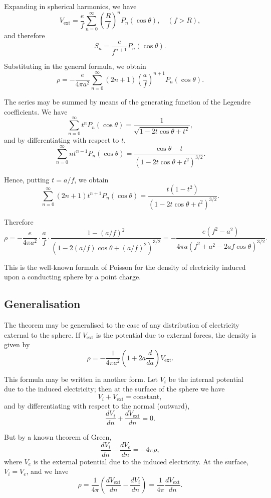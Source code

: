 \documentclass[11pt,a4paper]{book}
\begin{document}
\setcounter{page}{97}

Expanding in spherical harmonics, we have
\[
V_{\text{ext}} = \frac{e}{f} \sum_{n=0}^{\infty} \left(\frac{R}{f}\right)^n P_n(\cos\theta),
\quad (f > R),
\]
and therefore
\[
S_n = \frac{e}{f^{n+1}} P_n(\cos\theta).
\]

Substituting in the general formula, we obtain
\[
\rho = -\frac{e}{4\pi a^2} \sum_{n=0}^{\infty} (2n+1) \left(\frac{a}{f}\right)^{n+1} P_n(\cos\theta).
\]

The series may be summed by means of the generating function of the Legendre coefficients. We have
\[
\sum_{n=0}^{\infty} t^n P_n(\cos\theta) = \frac{1}{\sqrt{1-2t\cos\theta+t^2}},
\]
and by differentiating with respect to $t$,
\[
\sum_{n=0}^{\infty} n t^{n-1} P_n(\cos\theta) = \frac{\cos\theta-t}{(1-2t\cos\theta+t^2)^{3/2}}.
\]

\setcounter{page}{98}

Hence, putting $t = a/f$, we obtain
\[
\sum_{n=0}^{\infty} (2n+1) t^{n+1} P_n(\cos\theta)
= \frac{t(1-t^2)}{(1-2t\cos\theta+t^2)^{3/2}}.
\]

Therefore
\[
\rho = -\frac{e}{4\pi a^2} \cdot \frac{a}{f} \cdot \frac{1-(a/f)^2}{(1-2(a/f)\cos\theta+(a/f)^2)^{3/2}}
= -\frac{e(f^2-a^2)}{4\pi a(f^2+a^2-2af\cos\theta)^{3/2}}.
\]

This is the well-known formula of Poisson for the density of electricity induced upon a conducting sphere by a point charge.

\subsection*{Generalisation}

The theorem may be generalised to the case of any distribution of electricity external to the sphere. If $V_{\text{ext}}$ is the potential due to external forces, the density is given by
\[
\rho = -\frac{1}{4\pi a^2} \left(1 + 2a\frac{d}{da}\right) V_{\text{ext}}.
\]

\setcounter{page}{99}

This formula may be written in another form. Let $V_i$ be the internal potential due to the induced electricity; then at the surface of the sphere we have
\[
V_i + V_{\text{ext}} = \text{constant},
\]
and by differentiating with respect to the normal (outward),
\[
\frac{dV_i}{dn} + \frac{dV_{\text{ext}}}{dn} = 0.
\]

But by a known theorem of Green,
\[
\frac{dV_i}{dn} - \frac{dV_e}{dn} = -4\pi\rho,
\]
where $V_e$ is the external potential due to the induced electricity. At the surface, $V_i = V_e$, and we have
\[
\rho = \frac{1}{4\pi} \left(\frac{dV_{\text{ext}}}{dn} - \frac{dV_i}{dn}\right)
= \frac{1}{4\pi} \frac{dV_{\text{ext}}}{dn}.
\]
\end{document}
